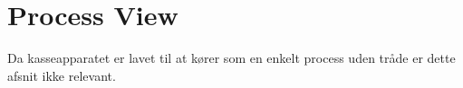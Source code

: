 \section{Process View}

Da kasseapparatet er lavet til at kører som en enkelt process uden tråde er dette afsnit ikke relevant.